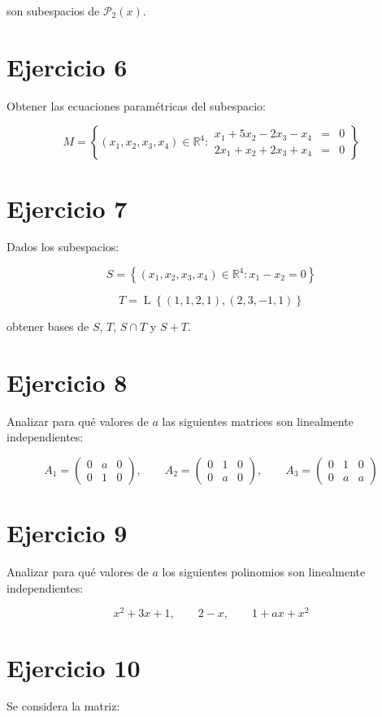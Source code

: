 \documentclass[11pt,a4paper]{article}
\newcommand{\R}{\mathbb{R}}
\newcommand{\Pn}{\mathcal{P}}
\newcommand{\Span}{\operatorname{L}}
\begin{document}
son subespacios de $\Pn_2(x)$.

\section{Ejercicio 6}
Obtener las ecuaciones paramétricas del subespacio:

\[
M=
\left\{
(x_1,x_2,x_3,x_4)\in\R^4:
\begin{array}{rcl}
x_1+5x_2-2x_3-x_4&=&0\\
2x_1+x_2+2x_3+x_4&=&0
\end{array}
\right\}
\]

\section{Ejercicio 7}
Dados los subespacios:

\[
S=
\left\{
(x_1,x_2,x_3,x_4)\in\R^4:
x_1-x_2=0
\right\}
\]

\[
T=
\Span\left\{
(1,1,2,1),
(2,3,-1,1)
\right\}
\]

obtener bases de $S$, $T$, $S\cap T$ y $S+T$.

\section{Ejercicio 8}
Analizar para qué valores de $a$ las siguientes matrices son linealmente independientes:

\[
A_1=
\begin{pmatrix}
0&a&0\\
0&1&0
\end{pmatrix},
\qquad
A_2=
\begin{pmatrix}
0&1&0\\
0&a&0
\end{pmatrix},
\qquad
A_3=
\begin{pmatrix}
0&1&0\\
0&a&a
\end{pmatrix}
\]

\section{Ejercicio 9}
Analizar para qué valores de $a$ los siguientes polinomios son linealmente independientes:

\[
x^2+3x+1,
\qquad
2-x,
\qquad
1+ax+x^2
\]

\section{Ejercicio 10}
Se considera la matriz:
\end{document}
